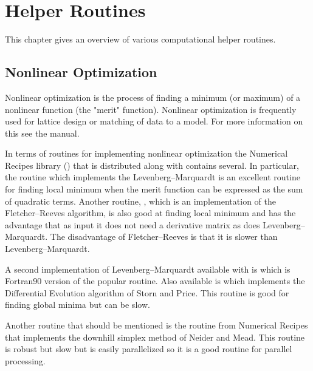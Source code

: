 \chapter{Helper Routines}
\label{c:helper}

This chapter gives an overview of various computational helper routines.

\section{Nonlinear Optimization}
\label{s:opti}

Nonlinear optimization is the process of finding a minimum (or
maximum) of a nonlinear function (the "merit" function). Nonlinear
optimization is frequently used for lattice design or matching of data
to a model. For more information on this see the \tao manual.

In terms of routines for implementing nonlinear optimization the
Numerical Recipes library () that is distributed along
with \bmad contains several. In particular, 
the routine 
which implements the Levenberg--Marquardt is an excellent routine for
finding local minimum when the merit function can be expressed as the
sum of quadratic terms. Another routine, , which is an
implementation of the Fletcher--Reeves algorithm, is also good at
finding local minimum and has the advantage that as input it does not
need a derivative matrix as does Levenberg--Marquardt. The
disadvantage of Fletcher--Reeves is that it is slower than
Levenberg--Marquardt. 

A second implementation of Levenberg--Marquardt available with \bmad
is  which is Fortran90 version of the popular
 routine. Also available is  which implements
the Differential Evolution algorithm of Storn and
Price\cite{b:de}. This routine is good for finding global minima
but can be slow. 

Another routine that should be mentioned is the  routine
from Numerical Recipes that implements the downhill simplex method of
Neider and Mead. This routine is robust but slow but is easily
parallelized so it is a good routine for parallel processing.

